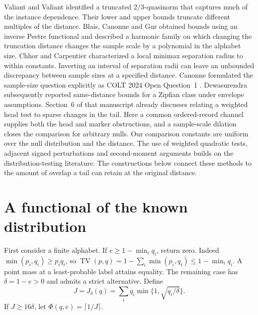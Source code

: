 \documentclass[11pt]{article}
\newcommand{\TV}{\operatorname{TV}}
\begin{document}
Valiant and Valiant \cite{valiantvaliant2017} identified a truncated $2/3$-quasinorm that captures much of the instance dependence. Their lower and upper bounds truncate different multiples of the distance. Blais, Canonne and Gur \cite{BCG} obtained bounds using an inverse Peetre functional and described a harmonic family on which changing the truncation distance changes the sample scale by a polynomial in the alphabet size. Chhor and Carpentier \cite{chhorcarpentier2022} characterized a local minimax separation radius to within constants. Inverting an interval of separation radii can leave an unbounded discrepancy between sample sizes at a specified distance. Canonne formulated the sample-size question explicitly as COLT 2024 Open Question~1 \cite{Canonne}. Dewasurendra \cite{Zipf} subsequently reported same-distance bounds for a Zipfian class under envelope assumptions. Section~6 of that manuscript already discusses relating a weighted head test to sparse changes in the tail. Here a common ordered-record channel supplies both the head and marker obstructions, and a sample-scale dilation closes the comparison for arbitrary nulls. Our comparison constants are uniform over the null distribution and the distance. The use of weighted quadratic tests, adjacent signed perturbations and second-moment arguments builds on the distribution-testing literature. The constructions below connect these methods to the amount of overlap a tail can retain at the original distance.

\section{A functional of the known distribution}\label{sec:functional}
First consider a finite alphabet. If $e\ge 1-\min_i q_i$, return zero. Indeed
$\min(p_i,q_i)\ge p_iq_i$, so $\TV(p,q)=1-\sum_i\min(p_i,q_i)\le1-\min_i q_i$. A point mass at a least-probable label attains equality. The remaining case has $\delta=1-e>0$ and admits a strict alternative. Define
\[
  J=J_\delta(q)=\sum_i q_i\min\{1,\sqrt{q_i/\delta}\}.
\]
If $J\ge16\delta$, let $\Phi(q,e)=\lceil1/J\rceil$.
\end{document}
